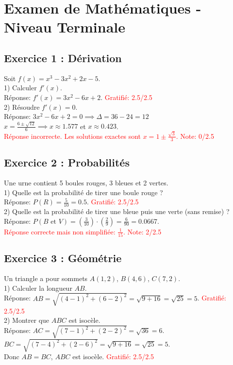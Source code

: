 \documentclass{article}
\begin{document}
\section*{Examen de Mathématiques - Niveau Terminale}

\subsection*{Exercice 1 : Dérivation}
Soit $f(x) = x^3 - 3x^2 + 2x - 5$.\\
1) Calculer $f'(x)$.\\
Réponse: $f'(x) = 3x^2 - 6x + 2$. \textcolor{red}{Gratifié: 2.5/2.5}\\
2) Résoudre $f'(x) = 0$.\\
Réponse: $3x^2 - 6x + 2 = 0 \implies \Delta = 36 - 24 = 12$\\
   $x = \frac{6 \pm \sqrt{12}}{6} \implies x \approx 1.577$ et $x \approx 0.423$.\\
   \textcolor{red}{Réponse incorrecte. Les solutions exactes sont $x = 1 \pm \frac{\sqrt{3}}{3}$. Note: 0/2.5}

\subsection*{Exercice 2 : Probabilités}
Une urne contient 5 boules rouges, 3 bleues et 2 vertes.\\
1) Quelle est la probabilité de tirer une boule rouge ?\\
Réponse: $P(R) = \frac{5}{10} = 0.5$. \textcolor{red}{Gratifié: 2.5/2.5}\\
2) Quelle est la probabilité de tirer une bleue puis une verte (sans remise) ?\\
Réponse: $P(B \text{ et } V) = \left(\frac{3}{10}\right) \cdot \left(\frac{2}{9}\right) = \frac{6}{90} = 0.0667$.\\
   \textcolor{red}{Réponse correcte mais non simplifiée: $\frac{1}{15}$. Note: 2/2.5}

\subsection*{Exercice 3 : Géométrie}
Un triangle a pour sommets $A(1,2)$, $B(4,6)$, $C(7,2)$.\\
1) Calculer la longueur $AB$.\\
Réponse: $AB = \sqrt{(4-1)^2 + (6-2)^2} = \sqrt{9 + 16} = \sqrt{25} = 5$. \textcolor{red}{Gratifié: 2.5/2.5}\\
2) Montrer que $ABC$ est isocèle.\\
Réponse: $AC = \sqrt{(7-1)^2 + (2-2)^2} = \sqrt{36} = 6$.\\
   $BC = \sqrt{(7-4)^2 + (2-6)^2} = \sqrt{9 + 16} = \sqrt{25} = 5$.\\
   Donc $AB = BC$, $ABC$ est isocèle. \textcolor{red}{Gratifié: 2.5/2.5}
\end{document}

